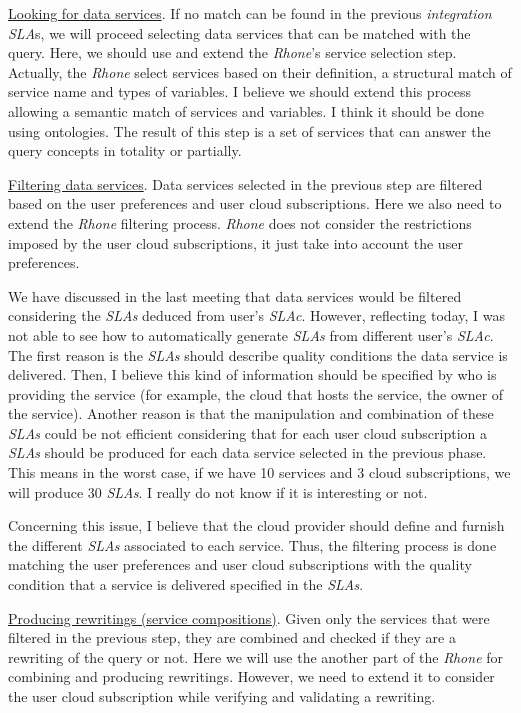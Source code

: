 \documentclass[10pt,a4paper,final]{report}
\begin{document}
\noindent \underline{Looking for data services}. If no match can be found in the previous \textsl{integration SLA}s, we will proceed selecting data services that can be matched with the query. Here, we should use and extend the \textsl{Rhone}'s service selection step. Actually, the \textsl{Rhone} select services based on their definition, a structural match of service name and types of variables. I believe we should extend this process allowing a semantic match of services and variables. I think it should be done using ontologies. The result of this step is a set of services that can answer the query concepts in totality or partially.

\noindent \underline{Filtering data services}. Data services selected in the previous step are filtered based on the user preferences and user cloud subscriptions. Here we also need to extend the \textsl{Rhone} filtering process. \textsl{Rhone} does not consider the restrictions imposed by the user cloud subscriptions, it just take into account the user preferences.

We have discussed in the last meeting that data services would be filtered considering the \textsl{SLAs} deduced from user's \textsl{SLAc}. However, reflecting today, I was not able to see how to automatically generate \textsl{SLAs} from different user's \textsl{SLAc}. The first reason is the \textsl{SLAs} should describe quality conditions the data service is delivered. Then, I believe this kind of information should be specified by who is providing the service (for example, the cloud that hosts the service, the owner of the service). Another reason is that the manipulation and combination of these \textsl{SLAs} could be not efficient considering that for each user cloud subscription a \textsl{SLAs} should be produced for each data service selected in the previous phase. This means in the worst case, if we have 10 services and 3 cloud subscriptions, we will produce 30 \textsl{SLAs}. I really do not know if it is interesting or not.

Concerning this issue, I believe that the cloud provider should define and furnish the different \textsl{SLAs} associated to each service. Thus, the filtering process is done matching the user preferences and user cloud subscriptions with the quality condition that a service is delivered specified in the \textsl{SLAs}.

\noindent \underline{Producing rewritings (service compositions)}. Given only the services that were filtered in the previous step, they are combined and checked if they are a rewriting of the query or not. Here we will use the another part of the \textsl{Rhone} for combining and producing rewritings. However, we need to extend it to consider the user cloud subscription while verifying and validating a rewriting.
\end{document}
